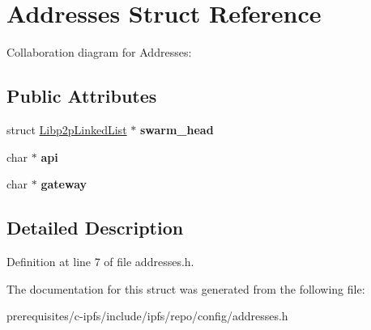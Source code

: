 \hypertarget{struct_addresses}{}\section{Addresses Struct Reference}
\label{struct_addresses}


Collaboration diagram for Addresses\+:
\subsection*{Public Attributes}
\begin{DoxyCompactItemize}
\item 
\mbox{\label{struct_addresses_a6b2c52c49dcb4ce57ac79c69a1deefe1}} 
struct \mbox{\hyperlink{struct_libp2p_linked_list}{Libp2p\+Linked\+List}} $\ast$ {\bfseries swarm\+\_\+head}
\item 
\mbox{\label{struct_addresses_a4218646d5da2c6fa5e58e707fae6866c}} 
char $\ast$ {\bfseries api}
\item 
\mbox{\label{struct_addresses_a66b409135bd4d59bfa1160591b923225}} 
char $\ast$ {\bfseries gateway}
\end{DoxyCompactItemize}


\subsection{Detailed Description}


Definition at line 7 of file addresses.\+h.



The documentation for this struct was generated from the following file\+:\begin{DoxyCompactItemize}
\item 
prerequisites/c-\/ipfs/include/ipfs/repo/config/addresses.\+h\end{DoxyCompactItemize}
